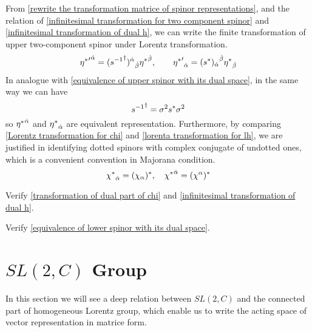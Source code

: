 From \eqref{rewrite the transformation matrice of spinor representations}, and the relation of \eqref{infinitesimal transformation for two component spinor} and \eqref{infinitesimal transformation of dual h}, we can write the finite transformation of upper two-component spinor under Lorentz transformation.
\begin{equation} \label{lorenta transformation for lh}
{{\eta^*}'}^{\dot{\alpha}} = {({s^{-1}}^{\dagger})^{\dot{\alpha}}}_{\dot{\beta}}{\eta^*}^{\dot{\beta}}
,\qquad
{{\eta^*}'}_{\dot{\alpha}} = {(s^{*})_{\dot{\alpha}}}^{\dot{\beta}}{\eta^*}_{\dot{\beta}}
\end{equation}
In analogue with \eqref{equivalence of upper spinor with its dual space}, in the same way we can have
\begin{equation} \label{equivalence of lower spinor with its dual space}
{s^{-1}}^{\dagger} = \sigma^2 s^* \sigma^2
\end{equation}
so ${\eta^*}^{\dot{\alpha}}$ and ${\eta^*}_{\dot{\alpha}}$ are equivalent representation.
Furthermore, by comparing \eqref{Lorentz transformation for chi} and \eqref{lorenta transformation for lh}, we are justified in identifying dotted spinors with complex conjugate of undotted ones, which is a convenient convention in Majorana condition.
\begin{equation}
  {\chi^*}_{\dot{\alpha}} = (\chi_{\alpha})^*
,\quad
{\chi^*}^{\dot{\alpha}} = (\chi^{\alpha})^*
\end{equation}

\begin{Exe}
Verify \eqref{transformation of dual part of chi} and \eqref{infinitesimal transformation of dual h}.
\end{Exe}

\begin{Exe}
Verify \eqref{equivalence of lower spinor with its dual space}.
\end{Exe}

\section{$SL(2,C)$ Group}

In this section we will see a deep relation between $SL(2,C)$ and the connected part of homogeneous Lorentz group, which enable us to write the acting space of vector representation in matrice form.

